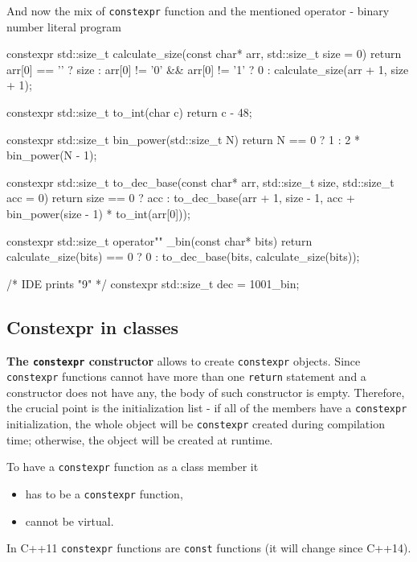 \documentclass[../main]{subfiles}
\begin{document}
    And now the mix of \texttt{constexpr} function and the mentioned operator - binary number literal program
\label{Binary numbers}
\begin{Code}
    constexpr std::size_t calculate_size(const char* arr,
                                         std::size_t size = 0)
    {
        return arr[0] == '\0'
           ? size
           : arr[0] != '0' && arr[0] != '1'
              ? 0
              : calculate_size(arr + 1, size + 1);
    }
    
    constexpr std::size_t to_int(char c)
    {
        return c - 48;
    }
    
    constexpr std::size_t bin_power(std::size_t N)
    {
        return N == 0 ? 1 : 2 * bin_power(N - 1);
    }
    
    constexpr std::size_t to_dec_base(const char* arr, std::size_t size,
                                      std::size_t acc = 0)
    {
        return size == 0
        ? acc
        : to_dec_base(arr + 1, size - 1,
                      acc + bin_power(size - 1) * to_int(arr[0]));
    }
    
    constexpr std::size_t operator"" _bin(const char* bits)
    {
        return calculate_size(bits) == 0
        ? 0
        : to_dec_base(bits, calculate_size(bits));
    }
    
    /* IDE prints "9" */
    constexpr std::size_t dec = 1001_bin;
\end{Code}

\subsection{Constexpr in classes}
    \textbf{The \texttt{constexpr} constructor} allows to create \texttt{constexpr} objects. Since \texttt{constexpr} functions cannot have more than one \texttt{return} statement
and a constructor does not have any, the body of such constructor is empty. Therefore, the crucial point is the initialization list - if all of the members
have a \texttt{constexpr} initialization, the whole object will be \texttt{constexpr} created during compilation time; otherwise, the object will be created at runtime.\newline

    To have a \texttt{constexpr} function as a class member it
\begin{itemize}
    \item has to be a \texttt{constexpr} function,
    \item cannot be virtual.
\end{itemize}
\noindent
In C++11 \texttt{constexpr} functions are \texttt{const} functions (it will change since C++14).
\end{document}
